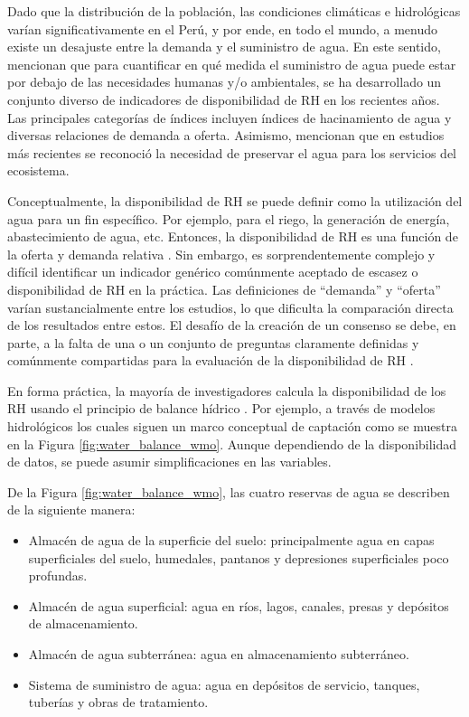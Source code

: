 \documentclass[12pt]{article}
\begin{document}
Dado que la distribución de la población, las condiciones climáticas e hidrológicas varían significativamente en el Perú, y por ende, en todo el mundo, a menudo existe un desajuste entre la demanda y el suministro de agua. En este sentido, \citet{xu2017water} mencionan que para cuantificar en qué medida el suministro de agua puede estar por debajo de las necesidades humanas y/o ambientales, se ha desarrollado un conjunto diverso de indicadores de disponibilidad de RH en los recientes años. Las principales categorías de índices incluyen índices de hacinamiento de agua y diversas relaciones de demanda a oferta. Asimismo, mencionan que en estudios más recientes se reconoció la necesidad de preservar el agua para los servicios del ecosistema.

Conceptualmente, la disponibilidad de RH se puede definir como la utilización del agua para un fin específico. Por ejemplo, para el riego, la generación de energía, abastecimiento de agua, etc. Entonces, la disponibilidad de RH es una función de la oferta y demanda relativa \citep{averyt2013sectoral}. Sin embargo, es sorprendentemente complejo y difícil identificar un indicador genérico comúnmente aceptado de escasez o disponibilidad de RH en la práctica. Las definiciones de “demanda” y “oferta” varían sustancialmente entre los estudios, lo que dificulta la comparación directa de los resultados entre estos. El desafío de la creación de un consenso se debe, en parte, a la falta de una o un conjunto de preguntas claramente definidas y comúnmente compartidas para la evaluación de la disponibilidad de RH \citep{xu2017water}.

\clearpage

\clearpage

En forma práctica, la mayoría de investigadores calcula la disponibilidad de los RH usando el principio de balance hídrico \citep{WMO2012,PNRH2013,juniati2018proposing}. Por ejemplo, a través de modelos hidrológicos los cuales siguen un marco conceptual de captación como se muestra en la Figura \ref{fig:water_balance_wmo}. Aunque dependiendo de la disponibilidad de datos, se puede asumir simplificaciones en las variables.

De la Figura \ref{fig:water_balance_wmo}, las cuatro reservas de agua se describen de la siguiente manera:
\begin{itemize}
    \item Almacén de agua de la superficie del suelo: principalmente agua en capas superficiales del suelo, humedales, pantanos y depresiones superficiales poco profundas.
    
    \item Almacén de agua superficial: agua en ríos, lagos, canales, presas y depósitos de almacenamiento.
    
    \item Almacén de agua subterránea: agua en almacenamiento subterráneo.
    
    \item Sistema de suministro de agua: agua en depósitos de servicio, tanques, tuberías y obras de tratamiento.
    
\end{itemize}
\end{document}
